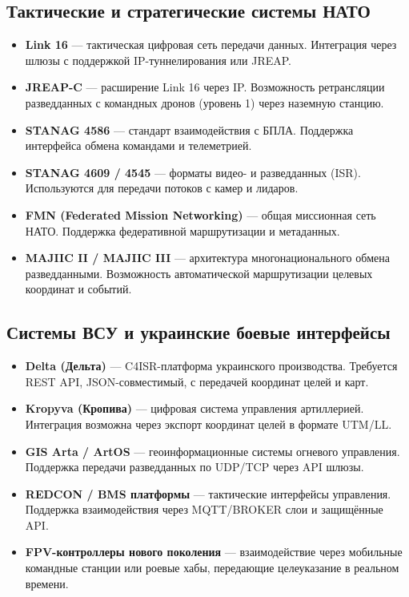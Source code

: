 \documentclass{article}
\begin{document}
\subsection*{Тактические и стратегические системы НАТО}
\begin{itemize}
    \item \textbf{Link 16} — тактическая цифровая сеть передачи данных. Интеграция через шлюзы с поддержкой IP-туннелирования или JREAP.
    \item \textbf{JREAP-C} — расширение Link 16 через IP. Возможность ретрансляции разведданных с командных дронов (уровень 1) через наземную станцию.
    \item \textbf{STANAG 4586} — стандарт взаимодействия с БПЛА. Поддержка интерфейса обмена командами и телеметрией.
    \item \textbf{STANAG 4609 / 4545} — форматы видео- и разведданных (ISR). Используются для передачи потоков с камер и лидаров.
    \item \textbf{FMN (Federated Mission Networking)} — общая миссионная сеть НАТО. Поддержка федеративной маршрутизации и метаданных.
    \item \textbf{MAJIIC II / MAJIIC III} — архитектура многонационального обмена разведданными. Возможность автоматической маршрутизации целевых координат и событий.
\end{itemize}

\subsection*{Системы ВСУ и украинские боевые интерфейсы}
\begin{itemize}
    \item \textbf{Delta (Дельта)} — C4ISR-платформа украинского производства. Требуется REST API, JSON-совместимый, с передачей координат целей и карт.
    \item \textbf{Kropyva (Кропива)} — цифровая система управления артиллерией. Интеграция возможна через экспорт координат целей в формате UTM/LL.
    \item \textbf{GIS Arta / ArtOS} — геоинформационные системы огневого управления. Поддержка передачи разведданных по UDP/TCP через API шлюзы.
    \item \textbf{REDCON / BMS платформы} — тактические интерфейсы управления. Поддержка взаимодействия через MQTT/BROKER слои и защищённые API.
    \item \textbf{FPV-контроллеры нового поколения} — взаимодействие через мобильные командные станции или роевые хабы, передающие целеуказание в реальном времени.
\end{itemize}
\end{document}
